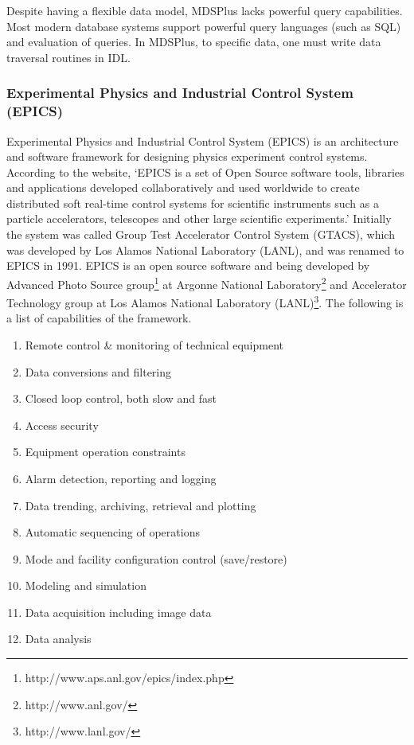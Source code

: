 Despite having a flexible data model, MDSPlus lacks powerful query capabilities. Most modern database systems support powerful query languages (such as SQL) and evaluation of queries. In MDSPlus, to specific data, one must write data traversal routines in IDL.

\subsubsection{Experimental Physics and Industrial Control System (EPICS)}\label{sec-epics}

Experimental Physics and Industrial Control System (EPICS)\cite{website:epics} is an architecture and software framework for designing physics experiment control systems. According to the website, `EPICS is a set of Open Source software tools, libraries and applications developed collaboratively and used worldwide to create distributed soft real-time control systems for scientific instruments such as a particle accelerators, telescopes and other large scientific experiments.' Initially the system was called Group Test Accelerator Control System (GTACS), which was developed by Los Alamos National Laboratory (LANL), and was renamed to EPICS in 1991. EPICS is an open source software and being developed by Advanced Photo Source group\footnote{http://www.aps.anl.gov/epics/index.php} at Argonne National Laboratory\footnote{http://www.anl.gov/} and Accelerator Technology group at Los Alamos National Laboratory (LANL)\footnote{http://www.lanl.gov/}\cite{lecture:johnson_intro_to_epics,dalesio1991epics}. The following is a list of capabilities of the framework\cite{lecture:johnson_intro_to_epics}.

\begin{enumerate}
\item Remote control \& monitoring of technical equipment
\item Data conversions and filtering
\item Closed loop control, both slow and fast
\item Access security
\item Equipment operation constraints
\item Alarm detection, reporting and logging
\item Data trending, archiving, retrieval and plotting
\item Automatic sequencing of operations
\item Mode and facility configuration control (save/restore)
\item Modeling and simulation
\item Data acquisition including image data
\item Data analysis
\end{enumerate}

